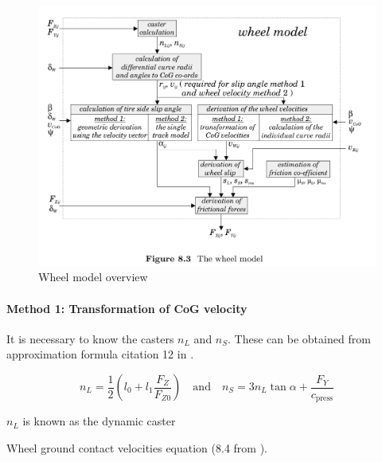 \begin{figure}
    \centering
    \includegraphics[width=\textwidth]{draft/stolen-figures/wheel-model.png}
    \caption{Wheel model overview}
    \label{fig:wheel-model}
\end{figure}

\paragraph{Method 1: Transformation of CoG velocity}

It is necessary to know the casters $n_L$ and $n_S$. These can be obtained from approximation formula citation 12 in \cite{kiencke}.

\begin{equation}
    n_L = \frac{1}{2}\left( l_0 + l_1\frac{F_Z}{F_{Z0}} \right)
    \quad \text{and} \quad 
    n_S = 3 n_L \tan{\alpha} + \frac{F_Y}{c_\text{press}}
\end{equation}

$n_L$ is known as the dynamic caster 


Wheel ground contact velocities equation (8.4 from \cite{kiencke}).

